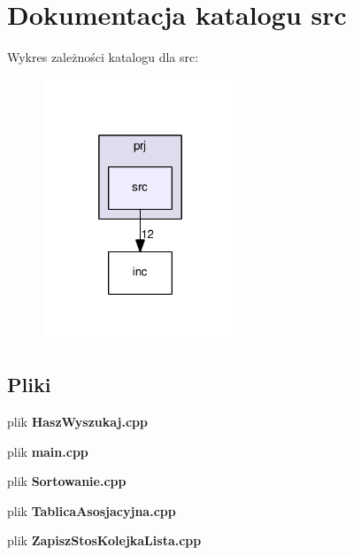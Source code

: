 \section{Dokumentacja katalogu src}
\label{dir_400757c3a0df52e783ed9699284f29ce}
Wykres zależności katalogu dla src\-:
\nopagebreak
\begin{figure}[H]
\begin{center}
\leavevmode
\includegraphics[width=166pt]{dir_400757c3a0df52e783ed9699284f29ce_dep}
\end{center}
\end{figure}
\subsection*{Pliki}
\begin{DoxyCompactItemize}
\item 
plik {\bf Hasz\-Wyszukaj.\-cpp}
\item 
plik {\bf main.\-cpp}
\item 
plik {\bf Sortowanie.\-cpp}
\item 
plik {\bf Tablica\-Asosjacyjna.\-cpp}
\item 
plik {\bf Zapisz\-Stos\-Kolejka\-Lista.\-cpp}
\end{DoxyCompactItemize}
